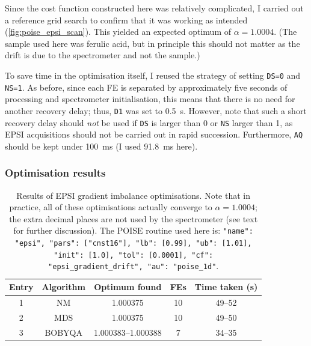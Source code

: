 Since the cost function constructed here was relatively complicated, I carried out a reference grid search to confirm that it was working as intended (\cref{fig:poise_epsi_scan}).
This yielded an expected optimum of $\alpha = 1.0004$.
(The sample used here was ferulic acid, but in principle this should not matter as the drift is due to the spectrometer and not the sample.)

To save time in the optimisation itself, I reused the strategy of setting \texttt{DS=0} and \texttt{NS=1}.
As before, since each FE is separated by approximately five seconds of processing and spectrometer initialisation, this means that there is no need for another recovery delay; thus, \texttt{D1} was set to \qty{0.5}{\s}.
However, note that such a short recovery delay should \textit{not} be used if \texttt{DS} is larger than 0 or \texttt{NS} larger than 1, as EPSI acquisitions should not be carried out in rapid succession.
Furthermore, \texttt{AQ} should be kept under \qty{100}{\ms} (I used \qty{91.8}{\ms} here).


\subsubsection{Optimisation results}

\begin{table}[htb]
    \centering
    \begin{tabular}{ccccc}
        \toprule
        Entry & Algorithm & Optimum found      & FEs & Time taken (\unit{\s}) \\
        \midrule
        1     & NM        & 1.000375           & 10  & 49--52               \\
        2     & MDS       & 1.000375           & 10  & 49--50               \\
        3     & BOBYQA    & 1.000383--1.000388 & 7   & 34--35               \\
        \bottomrule
    \end{tabular}
    \caption[EPSI gradient imbalance optimisations]{
        Results of EPSI gradient imbalance optimisations.
        Note that in practice, all of these optimisations actually converge to $\alpha = 1.0004$; the extra decimal places are not used by the spectrometer (see text for further discussion).
        The POISE routine used here is: \texttt{{"name": "epsi", "pars": ["cnst16"], "lb": [0.99], "ub": [1.01], "init": [1.0], "tol": [0.0001], "cf": "epsi_gradient_drift", "au": "poise_1d"}}.
    }
    \label{tbl:poise_epsi}
\end{table}

